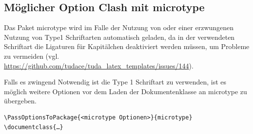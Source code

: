\documentclass[
	ngerman,%
	accentcolor=9c,%
]{tudapub}
\newcommand*{\pkg}[1]{\textsf{#1}}
\begin{document}
\subsection{Möglicher Option Clash mit microtype}
Das Paket \pkg{microtype} wird im Falle der Nutzung von  oder einer erzwungenen Nutzung von Type1 Schriftarten automatisch geladen, da in der verwendeten Schriftart die Ligaturen für Kapitälchen deaktiviert werden müssen, um Probleme zu vermeiden (vgl. \url{https://github.com/tudace/tuda_latex_templates/issues/144}).

Falls es zwingend Notwendig ist die Type 1 Schriftart zu verwenden, ist es möglich weitere Optionen vor dem Laden der Dokumentenklasse an \pkg{microtype} zu übergeben.

\begin{verbatim}
\PassOptionsToPackage{<microtype Optionen>}{microtype}
\documentclass{…}
\end{verbatim}
\appendix

\printbibliography
\end{document}
